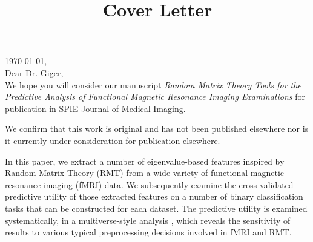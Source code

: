 \documentclass[10pt,a4paper]{article}
\begin{document}
% 
\thispagestyle{nofooter}  %
\setlength{\headheight}{30.0pt}
\normalsize

\title{Cover Letter}





\noindent
\today, \\
Dear Dr. Giger, \\

We hope you will consider our manuscript \emph{Random Matrix Theory Tools for
the Predictive Analysis of Functional Magnetic Resonance Imaging Examinations}
for publication in SPIE Journal of Medical Imaging.

We confirm that this work is original and has not been published elsewhere nor
is it currently under consideration for publication elsewhere.

In this paper, we extract a number of eigenvalue-based features inspired by
Random Matrix Theory (RMT) from a wide variety of functional magnetic resonance
imaging (fMRI) data. We subsequently examine the cross-validated predictive
utility of those extracted features on a number of binary classification tasks
that can be constructed for each dataset. The predictive utility is examined
systematically, in a  multiverse-style analysis
\citep{steegenIncreasingTransparencyMultiverse2016}, which reveals the
sensitivity of results to various typical preprocessing decisions involved in
fMRI and RMT.
\end{document}
